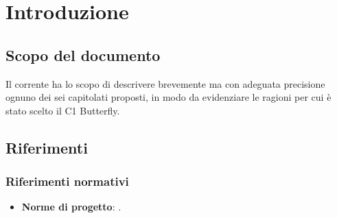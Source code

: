 \section{Introduzione} \label{introduzione}

    \subsection{Scopo del documento}
    Il  corrente ha lo scopo di descrivere brevemente ma con adeguata precisione ognuno dei sei capitolati proposti,
    in modo da evidenziare le ragioni per cui è stato scelto il  C1 Butterfly.

    

    

    \subsection{Riferimenti}

        \subsubsection{Riferimenti normativi}
            \begin{itemize}
                \item \textbf{Norme di progetto}: .
            \end{itemize}

